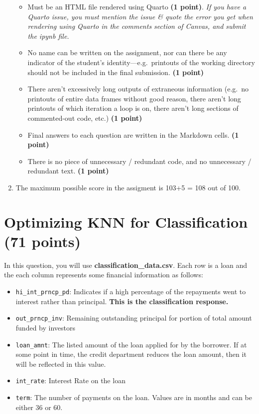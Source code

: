 \documentclass[
  letterpaper,
  DIV=11,
  numbers=noendperiod]{scrreprt}
\providecommand{\tightlist}{%
  \setlength{\itemsep}{0pt}\setlength{\parskip}{0pt}}\usepackage{longtable,booktabs,array}
\begin{document}
\begin{enumerate}
  \begin{itemize}
  \tightlist
  \item
    Must be an HTML file rendered using Quarto \textbf{(1 point)}.
    \emph{If you have a Quarto issue, you must mention the issue \&
    quote the error you get when rendering using Quarto in the comments
    section of Canvas, and submit the ipynb file.}
  \item
    No name can be written on the assignment, nor can there be any
    indicator of the student's identity---e.g.~printouts of the working
    directory should not be included in the final submission. \textbf{(1
    point)}
  \item
    There aren't excessively long outputs of extraneous information
    (e.g.~no printouts of entire data frames without good reason, there
    aren't long printouts of which iteration a loop is on, there aren't
    long sections of commented-out code, etc.) \textbf{(1 point)}
  \item
    Final answers to each question are written in the Markdown cells.
    \textbf{(1 point)}
  \item
    There is no piece of unnecessary / redundant code, and no
    unnecessary / redundant text. \textbf{(1 point)}
  \end{itemize}
\item
  The maximum possible score in the assigment is 103+5 = 108 out of 100.
\end{enumerate}

\section{Optimizing KNN for Classification (71
points)}\label{optimizing-knn-for-classification-71-points}

In this question, you will use \textbf{classification\_data.csv}. Each
row is a loan and the each column represents some financial information
as follows:

\begin{itemize}
\item
  \texttt{hi\_int\_prncp\_pd}: Indicates if a high percentage of the
  repayments went to interest rather than principal. \textbf{This is the
  classification response.}
\item
  \texttt{out\_prncp\_inv}: Remaining outstanding principal for portion
  of total amount funded by investors
\item
  \texttt{loan\_amnt}: The listed amount of the loan applied for by the
  borrower. If at some point in time, the credit department reduces the
  loan amount, then it will be reflected in this value.
\item
  \texttt{int\_rate}: Interest Rate on the loan
\item
  \texttt{term}: The number of payments on the loan. Values are in
  months and can be either 36 or 60.
\end{itemize}
\end{document}
